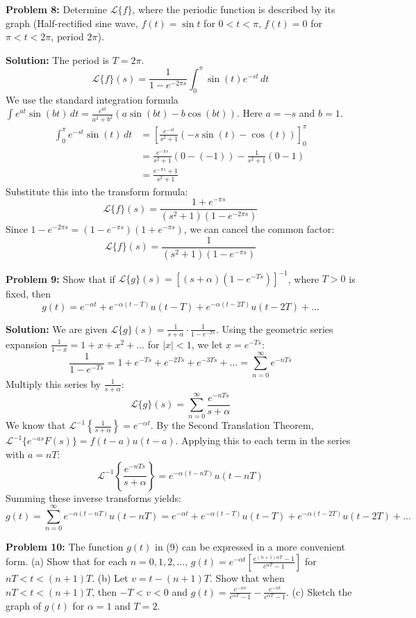 \documentclass[11pt, letterpaper]{article}
\theoremstyle{definition}
\theoremstyle{remark}
\begin{document}
\vspace{1em}
\textbf{Problem 8:} Determine $\mathcal{L}\{f\}$, where the periodic function is described by its graph (Half-rectified sine wave, $f(t) = \sin t$ for $0 < t < \pi$, $f(t) = 0$ for $\pi < t < 2\pi$, period $2\pi$).

\textbf{Solution:}
The period is $T = 2\pi$.
\[ \mathcal{L}\{f\}(s) = \frac{1}{1 - e^{-2\pi s}} \int_0^\pi \sin(t) e^{-st} \, dt \]
We use the standard integration formula $\int e^{at} \sin(bt) \, dt = \frac{e^{at}}{a^2+b^2}(a \sin(bt) - b \cos(bt))$. Here $a = -s$ and $b = 1$.
\begin{align*}
    \int_0^\pi e^{-st} \sin(t) \, dt &= \left[ \frac{e^{-st}}{s^2 + 1} (-s \sin(t) - \cos(t)) \right]_0^\pi \\
    &= \frac{e^{-\pi s}}{s^2 + 1} (0 - (-1)) - \frac{1}{s^2 + 1} (0 - 1) \\
    &= \frac{e^{-\pi s} + 1}{s^2 + 1}
\end{align*}
Substitute this into the transform formula:
\[ \mathcal{L}\{f\}(s) = \frac{1 + e^{-\pi s}}{(s^2 + 1)(1 - e^{-2\pi s})} \]
Since $1 - e^{-2\pi s} = (1 - e^{-\pi s})(1 + e^{-\pi s})$, we can cancel the common factor:
\[ \mathcal{L}\{f\}(s) = \frac{1}{(s^2 + 1)(1 - e^{-\pi s})} \]

\vspace{1em}
\textbf{Problem 9:} Show that if $\mathcal{L}\{g\}(s) = [(s+\alpha)(1-e^{-Ts})]^{-1}$, where $T > 0$ is fixed, then
\[ g(t) = e^{-\alpha t} + e^{-\alpha(t-T)}u(t-T) + e^{-\alpha(t-2T)}u(t-2T) + \dots \]

\textbf{Solution:}
We are given $\mathcal{L}\{g\}(s) = \frac{1}{s+\alpha} \cdot \frac{1}{1-e^{-Ts}}$.
Using the geometric series expansion $\frac{1}{1-x} = 1 + x + x^2 + \dots$ for $|x| < 1$, we let $x = e^{-Ts}$:
\[ \frac{1}{1-e^{-Ts}} = 1 + e^{-Ts} + e^{-2Ts} + e^{-3Ts} + \dots = \sum_{n=0}^\infty e^{-nTs} \]
Multiply this series by $\frac{1}{s+\alpha}$:
\[ \mathcal{L}\{g\}(s) = \sum_{n=0}^\infty \frac{e^{-nTs}}{s+\alpha} \]
We know that $\mathcal{L}^{-1}\left\{ \frac{1}{s+\alpha} \right\} = e^{-\alpha t}$.
By the Second Translation Theorem, $\mathcal{L}^{-1}\{ e^{-as} F(s) \} = f(t-a)u(t-a)$. Applying this to each term in the series with $a = nT$:
\[ \mathcal{L}^{-1}\left\{ \frac{e^{-nTs}}{s+\alpha} \right\} = e^{-\alpha(t-nT)} u(t-nT) \]
Summing these inverse transforms yields:
\[ g(t) = \sum_{n=0}^\infty e^{-\alpha(t-nT)} u(t-nT) = e^{-\alpha t} + e^{-\alpha(t-T)}u(t-T) + e^{-\alpha(t-2T)}u(t-2T) + \dots \]

\vspace{1em}
\textbf{Problem 10:} The function $g(t)$ in (9) can be expressed in a more convenient form.
(a) Show that for each $n = 0, 1, 2, \dots$, $g(t) = e^{-\alpha t} \left[ \frac{e^{(n+1)\alpha T} - 1}{e^{\alpha T} - 1} \right]$ for $nT < t < (n+1)T$.
(b) Let $v = t - (n+1)T$. Show that when $nT < t < (n+1)T$, then $-T < v < 0$ and $g(t) = \frac{e^{-\alpha v}}{e^{\alpha T} - 1} - \frac{e^{-\alpha t}}{e^{\alpha T} - 1}$.
(c) Sketch the graph of $g(t)$ for $\alpha = 1$ and $T = 2$.
\end{document}
